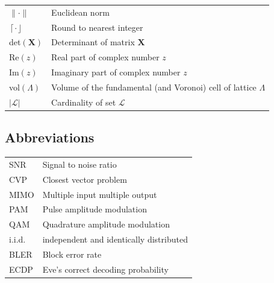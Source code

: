 \documentclass[english,12pt,a4paper,pdftex,sci,utf8]{aaltothesis}
\begin{document}
\begin{tabular}{ll}
$\| \cdot \| $     & Euclidean norm \\
$\left\lceil\cdot\right\rfloor$ & Round to nearest integer \\
det$(\mathbf{X})$  & Determinant of matrix $\mathbf{X}$ \\
Re$(z)$ & Real part of complex number $z$ \\
Im$(z)$ & Imaginary part of complex number $z$ \\
vol$(\Lambda)$ & Volume of the fundamental (and Voronoi) cell of lattice $\Lambda$ \\
$|\mathcal{L}|$ & Cardinality of set $\mathcal{L}$ \\
\end{tabular}

\subsection*{Abbreviations}

\begin{tabular}{ll}
SNR & Signal to noise ratio \\
CVP & Closest vector problem \\
MIMO & Multiple input multiple output \\
PAM & Pulse amplitude modulation \\
QAM & Quadrature amplitude modulation \\
i.i.d. & independent and identically distributed \\
BLER & Block error rate \\
ECDP & Eve's correct decoding probability \\
\end{tabular}


\cleardoublepage
\storeinipagenumber
{}
\setcounter{page}{1}


\end{document}
